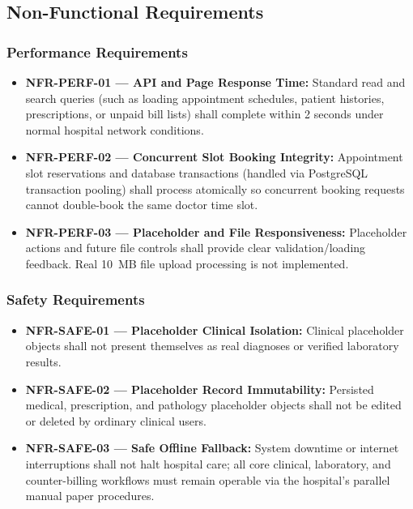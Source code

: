 \documentclass[11pt,a4paper]{article}
\begin{document}
\subsection{Non-Functional Requirements}

\subsubsection{Performance Requirements}
\begin{itemize}
    \item \textbf{NFR-PERF-01 — API and Page Response Time:} Standard read and search queries (such as loading appointment schedules, patient histories, prescriptions, or unpaid bill lists) shall complete within 2 seconds under normal hospital network conditions.
    \item \textbf{NFR-PERF-02 — Concurrent Slot Booking Integrity:} Appointment slot reservations and database transactions (handled via PostgreSQL transaction pooling) shall process atomically so concurrent booking requests cannot double-book the same doctor time slot.
    \item \textbf{NFR-PERF-03 — Placeholder and File Responsiveness:} Placeholder actions and future file controls shall provide clear validation/loading feedback. Real 10~MB file upload processing is not implemented.
\end{itemize}

\subsubsection{Safety Requirements}
\begin{itemize}
    \item \textbf{NFR-SAFE-01 — Placeholder Clinical Isolation:} Clinical placeholder objects shall not present themselves as real diagnoses or verified laboratory results.
    \item \textbf{NFR-SAFE-02 — Placeholder Record Immutability:} Persisted medical, prescription, and pathology placeholder objects shall not be edited or deleted by ordinary clinical users.
    \item \textbf{NFR-SAFE-03 — Safe Offline Fallback:} System downtime or internet interruptions shall not halt hospital care; all core clinical, laboratory, and counter-billing workflows must remain operable via the hospital's parallel manual paper procedures.
\end{itemize}
\end{document}
